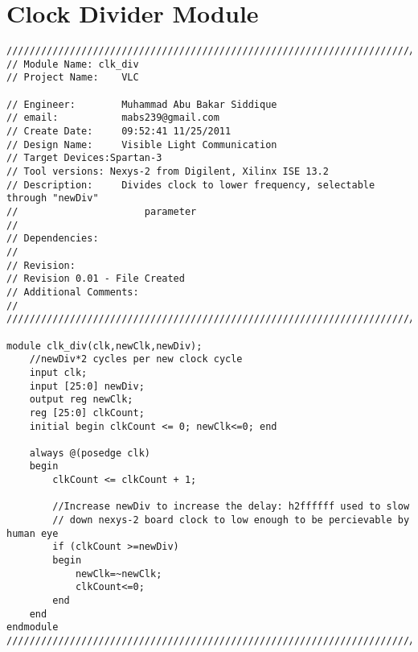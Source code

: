 \newpage
\section{Clock Divider Module}
\label{sec:clk_div}
\begin{lstlisting}[style=verilog-style,basicstyle=\tiny]
//////////////////////////////////////////////////////////////////////////////////
// Module Name:	clk_div
// Project Name: 	VLC

// Engineer: 		Muhammad Abu Bakar Siddique
// email:			mabs239@gmail.com
// Create Date:  	09:52:41 11/25/2011 
// Design Name: 	Visible Light Communication
// Target Devices:Spartan-3 
// Tool versions: Nexys-2 from Digilent, Xilinx ISE 13.2
// Description: 	Divides clock to lower frequency, selectable through "newDiv" 
//						parameter
//
// Dependencies: 	
//
// Revision: 
// Revision 0.01 - File Created
// Additional Comments: 
//
//////////////////////////////////////////////////////////////////////////////////

module clk_div(clk,newClk,newDiv);
	//newDiv*2 cycles per new clock cycle
	input clk;
	input [25:0] newDiv;
	output reg newClk;
	reg [25:0] clkCount;
	initial begin clkCount <= 0; newClk<=0; end
	
	always @(posedge clk)
	begin
		clkCount <= clkCount + 1;
		
		//Increase newDiv to increase the delay: h2ffffff used to slow 
		// down nexys-2 board clock to low enough to be percievable by human eye
		if (clkCount >=newDiv)
		begin
			newClk=~newClk;
			clkCount<=0;
		end
	end
endmodule
//////////////////////////////////////////////////////////////////////////////////
\end{lstlisting}


\newpage

